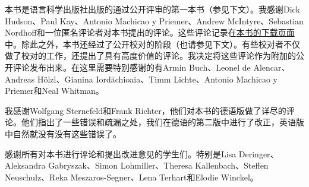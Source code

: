 
\addlines[2]
本书是语言科学出版社出版的通过公开评审的第一本书（参见下文）。我感谢Dick Hudson、Paul Kay、Antonio Machicao y Priemer、Andrew McIntyre、Sebastian Nordhoff和一位匿名评论者对本书提出的评论。这些评论记录在\href{\lsURL}{本书的下载页面}中。除此之外，本书还经过了公开校对的阶段（也请参见下文）。有些校对者不仅做了校对的工作，还提出了具有高度价值的评论。我决定将这些评论作为附加的公开评论发布出来。在这里需要特别感谢的有Armin Buch、Leonel de Alencar、Andreas Hölzl、Gianina Iordăchioaia、Timm Lichte、Antonio Machicao y Priemer和Neal Whitman。

我感谢Wolfgang Sternefeld和Frank Richter，他们对本书的德语版做了详尽的评论。他们指出了一些错误和疏漏之处，我们在德语的第二版中进行了改正，英语版中自然就没有没有这些错误了。

感谢所有对本书进行评论和提出改进意见的学生们。特别是Lisa Deringer、Aleksandra Gabryszak、Simon Lohmiller、Theresa Kallenbach、Steffen Neu\-schulz、Reka Meszaros-Segner、Lena Terhart和Elodie Winckel。

